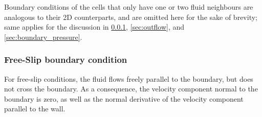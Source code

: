 \documentclass[a4paper, 12pt]{article}
\begin{document}
Boundary conditions of the cells that only have one or two fluid neighbours are analogous to their 2D counterparts, and are omitted here for the sake of brevity;
same applies for the discussion in  \ref{sec:free-slip}, \ref{sec:outflow}, and \ref{sec:boundary_pressure}.


\subsubsection{Free-Slip boundary condition}\label{sec:free-slip}
For free-slip conditions, the fluid flows freely parallel to the boundary, but does not cross the boundary. As a consequence, the velocity component normal to the boundary is zero, as well as the normal derivative of the velocity component parallel to the wall. 
%
%
\end{document}
